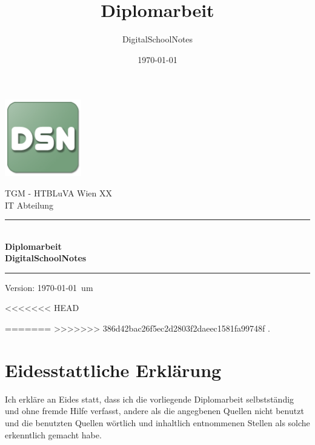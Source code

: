 \documentclass[12pt]{article}
\title{Diplomarbeit}
\author{DigitalSchoolNotes}
\date{\today}
\begin{document}
\begin{titlepage}
\begin{center}

\includegraphics[width=0.25\textwidth]{images/dsn_logo}\\
\vspace{5mm}

\LARGE TGM - HTBLuVA Wien XX \\ IT Abteilung  \\[1.5cm]

\rule{1.0\textwidth}{1mm}
{ \huge \bfseries \\[0.4cm]  \huge Diplomarbeit \\ \LARGE DigitalSchoolNotes \\[0.4cm] }

\rule{1.0\textwidth}{1mm}



\noindent 


\vfill

{\small Version: \today ~um  \thistime    }
\end{center}

\end{titlepage}


\ohead{\headmark}
\ofoot{\pagemark}

<<<<<<< HEAD
\newpage %

=======
\newpage
>>>>>>> 386d42bac26f5ec2d2803f2daeec1581fa99748f
{\small\color{white}.}
\vspace{-0.7cm}
\renewcommand*\contentsname{Inhalt}
\tableofcontents

\newpage %
%


\section*{Eidesstattliche Erklärung}
Ich erkläre an Eides statt, dass ich die vorliegende Diplomarbeit selbstständig und ohne fremde Hilfe verfasst, andere als die angegbenen Quellen nicht benutzt und die benutzten Quellen wörtlich und inhaltlich entnommenen Stellen als solche erkenntlich gemacht habe. \\
\end{document}
